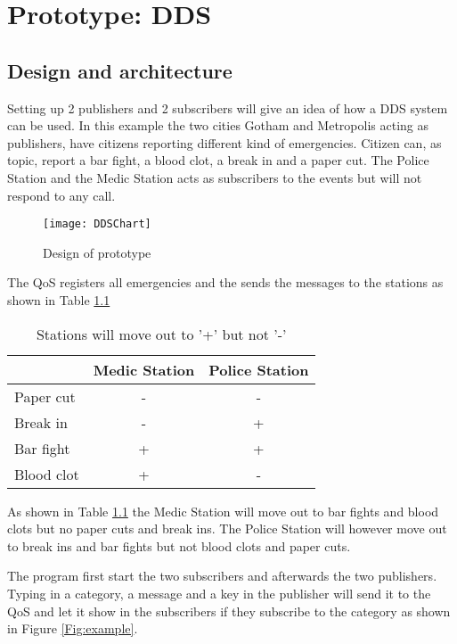 \documentclass[Main]{subfiles}
\begin{document}
\chapter{Prototype: DDS}


\section{Design and architecture}
Setting up 2 publishers and 2 subscribers will give an idea of how a DDS system can be used.
In this example the two cities Gotham and Metropolis acting as publishers, have citizens reporting different kind of emergencies.
Citizen can, as topic, report a bar fight, a blood clot, a break in and a paper cut.
The Police Station and the Medic Station acts as subscribers to the events but will not respond to any call.


\begin{figure}[hbtp]
\centering
\texttt{[image: DDSChart]}
\caption{Design of prototype}
\label{Fig:pub-sub}
\end{figure}

The QoS registers all emergencies and the sends the messages to the stations as shown in Table \ref{tab:emergencies}

\begin{table}[htbp]
\centering

\begin{tabular}{l|c|c}
 & Medic Station & Police Station \\ 
\hline 
Paper cut & - & - \\ 
Break in & - & + \\ 
Bar fight & + & + \\ 
Blood clot & + & - \\ 
\hline 
\end{tabular} 

\caption{Stations will move out to '+' but not '-'}
\label{tab:emergencies}
\end{table}

As shown in Table \ref{tab:emergencies} the Medic Station will move out to bar fights and blood clots but no paper cuts and break ins.
The Police Station will however move out to break ins and bar fights but not blood clots and paper cuts.

The program first start the two subscribers and afterwards the two publishers.
Typing in a category, a message and a key in the publisher will send it to the QoS and let it show in the subscribers if they subscribe to the category as shown in Figure \ref{Fig:example}.
\end{document}
